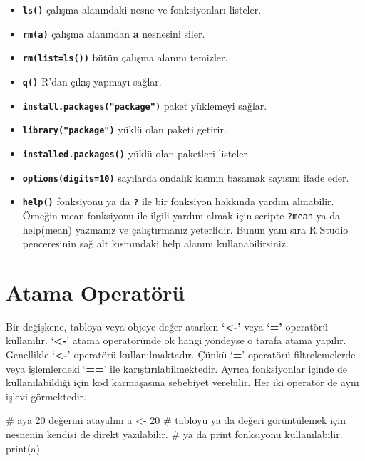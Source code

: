 \documentclass[
  letterpaper,
  DIV=11,
  numbers=noendperiod]{scrreprt}
\newenvironment{Shaded}{\begin{snugshade}}{\end{snugshade}}
\newcommand{\CommentTok}[1]{\textcolor[rgb]{0.37,0.37,0.37}{#1}}
\newcommand{\DecValTok}[1]{\textcolor[rgb]{0.68,0.00,0.00}{#1}}
\newcommand{\FunctionTok}[1]{\textcolor[rgb]{0.28,0.35,0.67}{#1}}
\newcommand{\NormalTok}[1]{\textcolor[rgb]{0.00,0.23,0.31}{#1}}
\newcommand{\OtherTok}[1]{\textcolor[rgb]{0.00,0.23,0.31}{#1}}
\begin{document}
\begin{itemize}
\item
  \textbf{\texttt{ls()}} çalışma alanındaki nesne ve fonksiyonları
  listeler.
\item
  \textbf{\texttt{rm(a)}} çalışma alanından \textbf{a} nesnesini siler.
\item
  \textbf{\texttt{rm(list=ls())}} bütün çalışma alanını temizler.
\item
  \textbf{\texttt{q()}} R'dan çıkış yapmayı sağlar.
\item
  \textbf{\texttt{install.packages("package")}} paket yüklemeyi sağlar.
\item
  \textbf{\texttt{library("package")}} yüklü olan paketi getirir.
\item
  \textbf{\texttt{installed.packages()}} yüklü olan paketleri listeler
\item
  \textbf{\texttt{options(digits=10)}} sayılarda ondalık kısmın basamak
  sayısını ifade eder.
\item
  \textbf{\texttt{help()}} fonksiyonu ya da \textbf{\texttt{?}} ile bir
  fonksiyon hakkında yardım alınabilir. Örneğin mean fonksiyonu ile
  ilgili yardım almak için scripte \texttt{?mean} ya da help(mean)
  yazmanız ve çalıştırmanız yeterlidir. Bunun yanı sıra R Studio
  penceresinin sağ alt kısmındaki help alanını kullanabilirsiniz.
\end{itemize}

\hypertarget{atama-operatuxf6ruxfc}{%
\section{Atama Operatörü}\label{atama-operatuxf6ruxfc}}

Bir değişkene, tabloya veya objeye değer atarken \textbf{`\textless-'}
veya \textbf{`='} operatörü kullanılır. `\textbf{\textless-}' atama
operatöründe ok hangi yöndeyse o tarafa atama yapılır. Genellikle
`\textbf{\textless-}' operatörü kullanılmaktadır. Çünkü `\textbf{=}'
operatörü filtrelemelerde veya işlemlerdeki `\textbf{==}' ile
karıştırılabilmektedir. Ayrıca fonksiyonlar içinde de kullanılabildiği
için kod karmaşasına sebebiyet verebilir. Her iki operatör de aynı
işlevi görmektedir.

\begin{Shaded}
\begin{Highlighting}[]
\CommentTok{\# a\textquotesingle{}ya 20 değerini atayalım  }
\NormalTok{a }\OtherTok{\textless{}{-}} \DecValTok{20}    
\CommentTok{\# tabloyu ya da değeri görüntülemek için nesnenin kendisi de direkt yazılabilir.  }
\CommentTok{\# ya da print fonksiyonu kullanılabilir.   }
\FunctionTok{print}\NormalTok{(a)    }
\end{Highlighting}
\end{Shaded}
\end{document}
